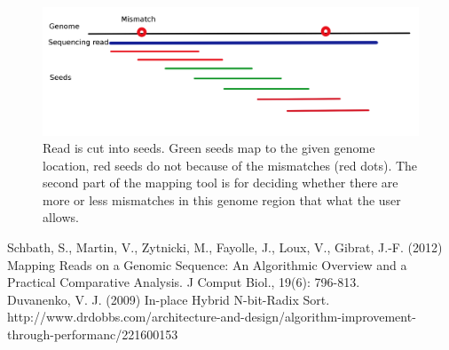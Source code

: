 \documentclass[portrait, a0paper, margin=7cm]{baposter}
\begin{document}
\begin{poster}
{\begin{figure}[H]
\begin{center}
\includegraphics[scale=0.5]{map}
\caption{Read is cut into seeds. Green seeds map to the given genome location, red seeds do not because of the mismatches (red dots). The second part of the mapping tool is for deciding whether there are more or less mismatches in this genome region that what the user allows.}
\end{center}
\end{figure}

}

 {

}

 {

\smaller %

Schbath, S., Martin, V., Zytnicki, M., Fayolle, J., Loux, V., Gibrat, J.-F. (2012) Mapping Reads on a Genomic Sequence: An Algorithmic Overview and a Practical Comparative Analysis. J Comput Biol., 19(6): 796-813.\\

Duvanenko, V. J. (2009) In-place Hybrid N-bit-Radix Sort. http://www.drdobbs.com/architecture-and-design/algorithm-improvement-through-performanc/221600153\\
}




\end{poster}
\end{document}
